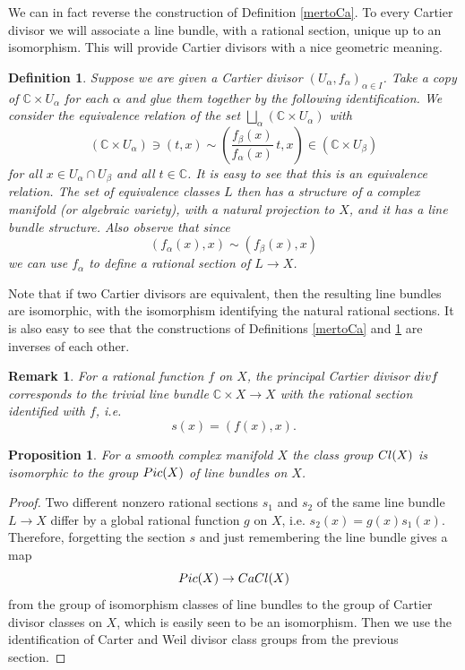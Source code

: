 \documentclass[11pt]{article}
\numberwithin{equation}{section}
\numberwithin{footnote}{section}
\newtheorem{prop}[thm]{Proposition}
\newtheorem{defn}[thm]{Definition}
\newtheorem{rem}[thm]{Remark}
\newcommand{\C}{{\mathbb C}}
\begin{document}
\smallskip
We can in fact reverse the construction of Definition \ref{mertoCa}. To every Cartier divisor we will associate a line bundle, with a  rational section, unique up to an isomorphism. This will provide Cartier divisors with a nice geometric meaning.

\smallskip
\begin{defn}\label{Catomer}
Suppose we are given a Cartier divisor $(U_\alpha,f_\alpha)_{\alpha\in I}$. Take a copy of $\C\times U_\alpha$ for each $\alpha$ and glue them together by the following identification. We consider the equivalence relation of the set $\bigsqcup_\alpha (\C\times  U_\alpha)$ with  
$$
(\C\times U_\alpha)\ni(t,x)\sim\left( \frac {f_\beta(x)}{f_{\alpha}(x)} \,t, x\right)\in (\C\times U_\beta)
$$
for all $x\in U_\alpha\cap U_\beta$ and all $t\in \C$. It is easy to see that this is an equivalence relation. The set of equivalence classes $L$ then has a structure of a complex manifold (or algebraic variety), with a natural projection to $X$, and it has a line bundle structure.
Also observe that since 
$$
(f_\alpha(x),x)\sim(f_\beta (x),x)
$$
we can use $f_\alpha$ to define a  rational section of $L\to X$. 
\end{defn}


Note that if two Cartier divisors are equivalent, then the resulting line bundles are isomorphic, with the isomorphism identifying the natural  rational sections. It is also easy to see that the constructions of Definitions \ref{mertoCa} and \ref{Catomer} are inverses of each other.

\smallskip
\begin{rem}
For a  rational function $f$ on $X$, the principal Cartier divisor ${\rm div }f$ corresponds to the trivial line bundle $\C\times X\to X$ with the  rational section identified with $f$, i.e.
$$
s(x) = (f(x),x).
$$
\end{rem}

\begin{prop}
For a smooth complex manifold  $X$ the class group ${\rm Cl}(X)$ is isomorphic to the group ${\rm Pic}(X)$ of line bundles on $X$.
\end{prop}

\begin{proof}
Two different nonzero  rational sections $s_1$ and $s_2$ of the same line bundle $L\to X$ differ by a global  rational function $g$ on $X$, i.e. $s_2(x) = g(x)s_1(x)$. Therefore, forgetting the section $s$ and just remembering the line bundle gives a map
$$
{\rm Pic}(X)\to {\rm CaCl(X)}
$$
from the group of isomorphism classes of line bundles to the group of Cartier divisor classes on $X$, which is easily seen to be an isomorphism. Then we use the identification of Carter and Weil divisor class groups from the previous section.
\end{proof}
\end{document}
